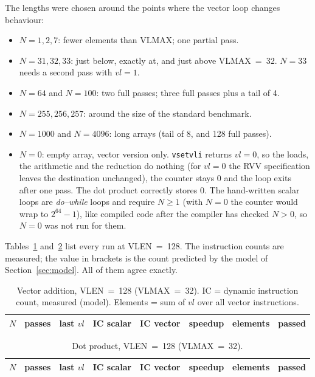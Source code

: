 \documentclass[11pt,a4paper]{article}
\newcommand{\code}[1]{\texttt{#1}}
\begin{document}
The lengths were chosen around the points where the vector loop changes behaviour:
\begin{itemize}
  \item $N=1, 2, 7$: fewer elements than VLMAX; one partial pass.
  \item $N=31, 32, 33$: just below, exactly at, and just above VLMAX~=~32. $N=33$ needs a
        second pass with $vl=1$.
  \item $N=64$ and $N=100$: two full passes; three full passes plus a tail of 4.
  \item $N=255, 256, 257$: around the size of the standard benchmark.
  \item $N=1000$ and $N=4096$: long arrays (tail of 8, and 128 full passes).
  \item $N=0$: empty array, vector version only. \code{vsetvli} returns $vl=0$, so the loads,
        the arithmetic and the reduction do nothing (for $vl=0$ the RVV specification
        leaves the destination unchanged), the counter stays 0 and the loop exits after one
        pass. The dot product correctly stores 0. The hand-written scalar loops are
        \emph{do--while} loops and require $N \ge 1$ (with $N=0$ the counter would wrap
        to $2^{64}-1$), like compiled code after the compiler has checked $N > 0$, so $N=0$
        was not run for them.
\end{itemize}

Tables~\ref{tab:len-vadd} and~\ref{tab:len-dot} list every run at VLEN~=~128. The instruction
counts are measured; the value in brackets is the count predicted by the model of
Section~\ref{sec:model}. All of them agree exactly.

\begin{table}[H]
\centering\small
\caption{Vector addition, VLEN~=~128 (VLMAX~=~32). IC = dynamic instruction count, measured
(model). Elements = sum of $vl$ over all vector instructions.}
\label{tab:len-vadd}
\begin{tabular}{rrrrrrrc}
\toprule
$N$ & passes & last $vl$ & IC scalar & IC vector & speedup & elements & passed \\
\midrule

\bottomrule
\end{tabular}
\end{table}

\begin{table}[H]
\centering\small
\caption{Dot product, VLEN~=~128 (VLMAX~=~32).}
\label{tab:len-dot}
\begin{tabular}{rrrrrrrc}
\toprule
$N$ & passes & last $vl$ & IC scalar & IC vector & speedup & elements & passed \\
\midrule

\bottomrule
\end{tabular}
\end{table}
\end{document}
